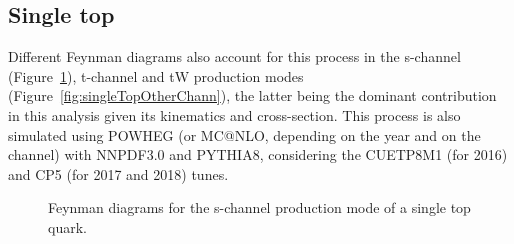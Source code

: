 \documentclass[a4paper, 10pt, openright]{report}
\begin{document}
\subsection{Single top} \label{subsection:singleTop}

Different Feynman diagrams also account for this process in the s-channel (Figure~\ref{fig:singleTopSChann}), t-channel and tW production modes (Figure~\ref{fig:singleTopOtherChann}), the latter being the dominant contribution in this analysis given its kinematics and cross-section. This process is also simulated using POWHEG (or MC@NLO, depending on the year and on the channel) with NNPDF3.0 and PYTHIA8, considering the CUETP8M1 (for 2016) and CP5 (for 2017 and 2018) tunes.

\begin{figure}[htbp]
\centering
\begin{minipage}[b]{.22\textwidth}
\end{minipage} 
\begin{minipage}[b]{.28\textwidth}
\end{minipage} 
\caption{Feynman diagrams for the s-channel production mode of a single top quark.}
\label{fig:singleTopSChann}
\end{figure}
\end{document}
